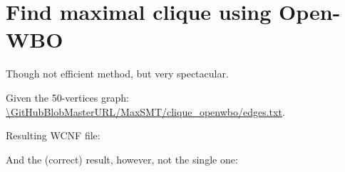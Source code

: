 \section{Find maximal clique using Open-WBO}

\renewcommand{\CURPATH}{MaxSMT/clique_openwbo}

Though not efficient method, but very spectacular.

Given the 50-vertices graph: \url{\GitHubBlobMasterURL/\CURPATH/edges.txt}.



Resulting WCNF file:



And the (correct) result, however, not the single one:



